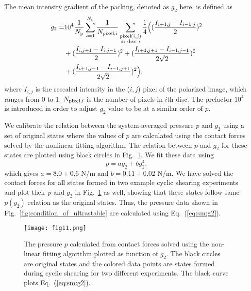 \documentclass[twocolumn,showkeys,superscriptaddress,preprintnumbers,amsmath,amssymb,showpacs,prx,longbibliography]{revtex4-2}
\begin{document}
The mean intensity gradient of the packing, denoted as $g_2$ here, is defined as
\begin{equation}
\begin{split}
 g_2 =& 10^4 \frac{1}{N_{\rm p}}\sum_{i=1}^{N_{\rm p}}\frac{1}{N_{{\rm pixel},i}}\sum_{\substack{{\rm pixel} (i,j)\\{\rm in~disc}~i}}\frac{1}{4}\Big( (\frac{I_{i+1,j}-I_{i-1,j}}{2})^2\\
 &+(\frac{I_{i,j+1}-I_{i,j-1}}{2})^2+(\frac{I_{i+1,j+1}-I_{i-1,j-1}}{2\sqrt{2}})^2\\
 &+(\frac{I_{i+1,j-1}-I_{i-1,j+1}}{2\sqrt{2}})^2 \Big),
 \end{split}
\end{equation}
where $I_{i,j}$ is the rescaled intensity in the ($i,j$) pixel of the polarized image, which ranges from 0 to 1. $N_{{\rm pixel},i}$ is the number of pixels in $i$th disc. The prefactor $10^4$ is introduced in order to adjust $g_2$ value to be at a similar order of $p$.

We calibrate the relation between the system-averaged pressure $p$ and $g_2$ using a set of original states where the values of $p$ are calculated using the contact forces solved by the nonlinear fitting algorithm. The relation between $p$ and $g_2$ for these states are plotted using black circles in Fig.~\ref{fig:sm:g2}. We fit these data using 
\begin{equation}\label{eq:sm:g2}
    p=ag_2+bg_2^4,
\end{equation}
which gives $a=8.0\pm 0.6$ N/m and $b=0.11\pm 0.02$ N/m. We have solved the contact forces for all states formed in two example cyclic shearing experiments and plot their $p$ and $g_2$ in Fig.~\ref{fig:sm:g2} as well, showing that these states follow same $p(g_2)$ relation as the original states. Thus, the pressure data shown in Fig.~\ref{fig:condition_of_ultrastable} are calculated using Eq.~(\ref{eq:sm:g2}).




\begin{figure}[t]
    \centering
    \texttt{[image: fig11.png]}
    \caption{The pressure $p$ calculated from contact forces solved using the non-linear fitting algorithm plotted as function of $g_2$. The black circles are original states and the colored data points are states formed during cyclic shearing for two different experiments. The black curve plots Eq.~(\ref{eq:sm:g2}).}
    \label{fig:sm:g2}
\end{figure}
\end{document}
